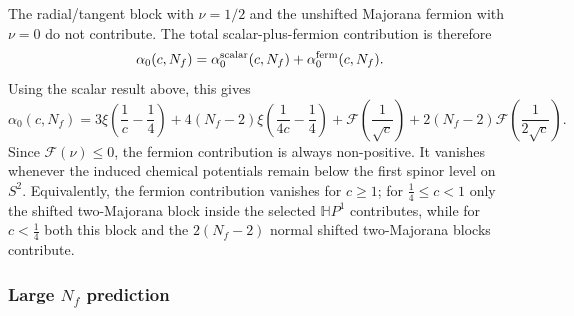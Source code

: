 \documentclass[a4paper,11pt]{article}
\begin{document}
The radial/tangent block with $\nu=1/2$ and the unshifted Majorana fermion with $\nu=0$ do not contribute. The total scalar-plus-fermion contribution is therefore
\begin{equation}
  \alpha_0(c,N_f) = \alpha_0^{\rm scalar}(c,N_f) + \alpha_0^{\rm ferm}(c,N_f).
\end{equation}
Using the scalar result above, this gives
\begin{equation}
  \alpha_0(c,N_f)
  =
  3\xi\left(\frac1c-\frac14\right)
  +
  4(N_f-2)\xi\left(\frac1{4c}-\frac14\right)
  +
  \mathcal F\left(\frac1{\sqrt c}\right)
  +
  2(N_f-2)
  \mathcal F\left(\frac1{2\sqrt c}\right).
\end{equation}
Since $\mathcal F(\nu)\leq0$, the fermion contribution is always non-positive. It vanishes whenever the induced chemical potentials remain below the first spinor level on $S^2$. Equivalently, the fermion contribution vanishes for $c\geq 1$; for $\frac14\leq c<1$ only the shifted two-Majorana block inside the selected $\mathbb HP^1$ contributes, while for $c<\frac14$ both this block and the $2(N_f-2)$ normal shifted two-Majorana blocks contribute.


\subsubsection{Large $N_f$ prediction}
\end{document}

